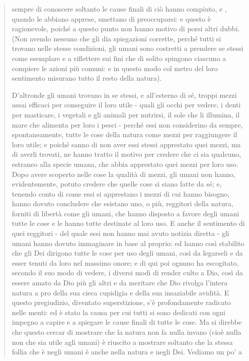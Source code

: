 \begin{quotation}
\begin{enumerate}
		sempre di conoscere soltanto le cause finali di ciò hanno compiuto, e , quando le abbiano
		apprese, smettano di preoccuparsi: e questo è ragionevole, poiché a questo punto non hanno motivo di porsi altri dubbi. (Non avendo nessuno che gli dia spiegazioni corrette, perché
		tutti si trovano nelle stesse condizioni, gli umani sono costretti a prendere se stessi come
		esemplare e a riflettere sui fini che di solito spingono ciascuno a compiere le azioni più comuni: e in questo modo col metro del loro sentimento misurano tutto il resto della natura).
	\end{enumerate} 
	D’altronde gli umani trovano in se stessi, e all’esterno di sé, troppi mezzi assai efficaci per
	conseguire il loro utile - quali gli occhi per vedere, i denti per masticare, i vegetali e gli animali per nutrirsi, il sole che li illumina, il mare che alimenta per loro i pesci - perché essi
	non considerino da sempre, spontaneamente, tutte le cose della natura come mezzi per raggiungere il loro utile; e poiché sanno di non aver essi stessi apprestato quei mezzi, ma di
	averli trovati, ne hanno tratto il motivo per credere che ci sia qualcuno, estraneo alla specie umana, che abbia apprestato quei mezzi per loro uso. Dopo avere scoperto nelle cose la
	qualità di mezzi, gli umani non hanno, evidentemente, potuto credere che quelle cose si
	siano fatte da sé; e, tenendo conto di come essi si apprestano i mezzi di cui hanno bisogno,
	hanno dovuto concludere che esistano uno, o più, reggitori della natura, forniti di libertà
	come gli umani, che hanno disposto a favore degli umani tutte le cose e le hanno tutte destinate al loro uso. E anche il sentimento di quei reggitori - del quale essi non hanno mai
	avuto notizia diretta - gli umani hanno dovuto immaginare in base al proprio: ed hanno così stabilito che gli Dei dirigono tutte le cose per uso degli umani, così da legarseli e da esser
	tenuti da loro nel massimo onore; e di qui poi ognuno ha escogitato, secondo il suo modo
	di vedere, i diversi modi di render culto a Dio, così da essere amato da Dio più gli altri e da
	meritare che Dio rivolga l’intera natura a pro della sua cieca cupidigia e della sua insaziabile avidità. E questo pregiudizio, diventato superstizione, s’è profondamente radicato nelle
	menti: ed è stato la causa per cui tutti si sono dedicati con ogni impegno a capire e a spiegare le cause finali di tutte le cose. Ma si direbbe che questo cercar di mostrare che la natura
	non fa nulla invano (cioè nulla non che sia utile agli umani) è riuscito a mostrare soltanto
	che la stessa follia che è negli umani è anche nella natura e negli Dei. Vediamo un po’ a

\end{quotation}
